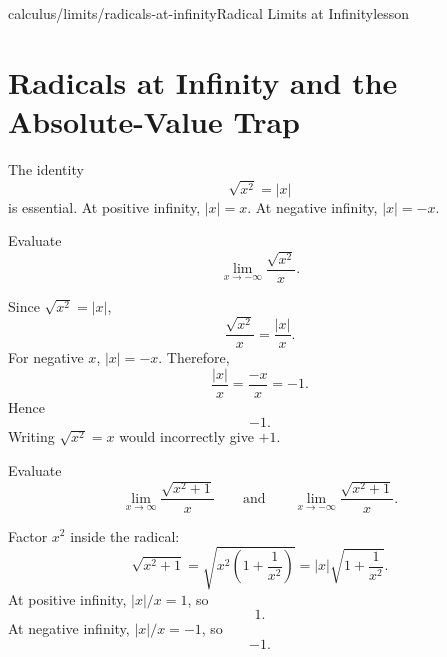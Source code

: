 \begin{webpage}{calculus/limits/radicals-at-infinity}{Radical Limits at Infinity}{lesson}
\section{Radicals at Infinity and the Absolute-Value Trap}


The identity
\[
  \boxed{\sqrt{x^2}=|x|}
\]
is essential. At positive infinity, \(|x|=x\). At negative infinity, \(|x|=-x\).

\begin{bgguided}[title={Why the sign changes}]
Evaluate
\[
  \lim_{x\to-\infty}\frac{\sqrt{x^2}}{x}.
\]

\begin{bgsolution}
Since \(\sqrt{x^2}=|x|\),
\[
  \frac{\sqrt{x^2}}{x}=\frac{|x|}{x}.
\]
For negative \(x\), \(|x|=-x\). Therefore,
\[
  \frac{|x|}{x}=\frac{-x}{x}=-1.
\]
Hence
\[
  \boxed{-1}.
\]
Writing \(\sqrt{x^2}=x\) would incorrectly give \(+1\).
\end{bgsolution}
\end{bgguided}

\begin{bgexample}[title={The same radical on two ends}]
Evaluate
\[
  \lim_{x\to\infty}\frac{\sqrt{x^2+1}}{x}
  \qquad\text{and}\qquad
  \lim_{x\to-\infty}\frac{\sqrt{x^2+1}}{x}.
\]

\begin{bgsolution}
Factor \(x^2\) inside the radical:
\[
  \sqrt{x^2+1}=\sqrt{x^2\left(1+\frac1{x^2}\right)}
  =|x|\sqrt{1+\frac1{x^2}}.
\]
At positive infinity, \(|x|/x=1\), so
\[
  \boxed{1}.
\]
At negative infinity, \(|x|/x=-1\), so
\[
  \boxed{-1}.
\]
\end{bgsolution}
\end{bgexample}
\end{webpage}

